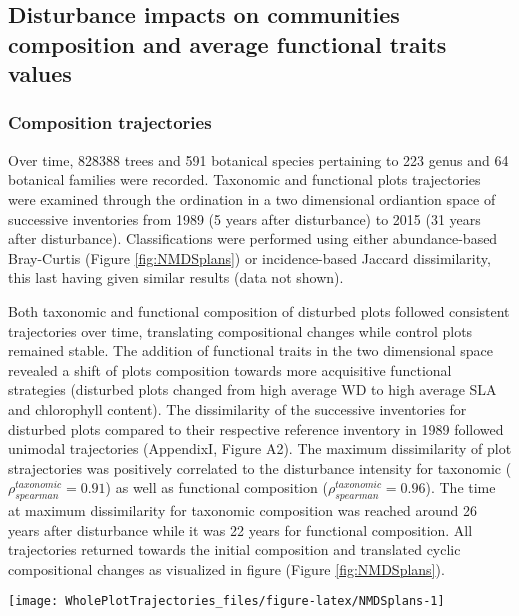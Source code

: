 \documentclass[fleqn,10pt]{ArtEcoFoG} %
\theoremstyle{definition}
\theoremstyle{definition}
\theoremstyle{definition}
\theoremstyle{remark}
\begin{document}
\subsection{Disturbance impacts on communities composition and average
functional traits
values}\label{disturbance-impacts-on-communities-composition-and-average-functional-traits-values}

\subsubsection{Composition trajectories}\label{composition-trajectories}

Over time, 828388 trees and 591 botanical species pertaining to 223
genus and 64 botanical families were recorded. Taxonomic and functional
plots trajectories were examined through the ordination in a two
dimensional ordiantion space of successive inventories from 1989 (5
years after disturbance) to 2015 (31 years after disturbance).
Classifications were performed using either abundance-based Bray-Curtis
(Figure \ref{fig:NMDSplans}) or incidence-based Jaccard dissimilarity,
this last having given similar results (data not shown).

Both taxonomic and functional composition of disturbed plots followed
consistent trajectories over time, translating compositional changes
while control plots remained stable. The addition of functional traits
in the two dimensional space revealed a shift of plots composition
towards more acquisitive functional strategies (disturbed plots changed
from high average WD to high average SLA and chlorophyll content). The
dissimilarity of the successive inventories for disturbed plots compared
to their respective reference inventory in 1989 followed unimodal
trajectories (AppendixI, Figure A2). The maximum dissimilarity of plot
strajectories was positively correlated to the disturbance intensity for
taxonomic (\(\rho_{spearman}^{taxonomic}=0.91\)) as well as functional
composition (\(\rho_{spearman}^{taxonomic}=0.96\)). The time at maximum
dissimilarity for taxonomic composition was reached around 26 years
after disturbance while it was 22 years for functional composition. All
trajectories returned towards the initial composition and translated
cyclic compositional changes as visualized in figure (Figure
\ref{fig:NMDSplans}).

\begin{figure*}

{\centering \texttt{[image: WholePlotTrajectories\_files/figure-latex/NMDSplans-1]} 

}

\caption{Trajectories of the plots in terms of \textbf{(a)} flora composition and \textbf{(b)} functional composition regarding the 6 leaf and stem functional traits,the maximum allometric height and seed mass class in the two-dimensional space from the NMDS performed for the 30 years after disturbance. Distance matrix for NMDS were computed from the Bray-curtis dissimilarity between successive inventories. Line colors represent the disturbance treatment (green for control, blue for T1,orange for T2 and red for T3).}\label{fig:NMDSplans}
\end{figure*}
\end{document}
